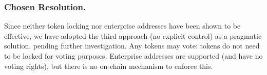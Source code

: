\subsubsection*{Chosen Resolution.}

Since neither token locking nor enterprise addresses have been shown to be effective, we have adopted the third approach (no explicit control)
as a pragmatic solution, pending further investigation.
Any tokens may vote: tokens do not need to be locked for voting purposes.  Enterprise addresses are supported (and have no voting rights), but
there is no on-chain mechanism to enforce this.

\pagebreak
